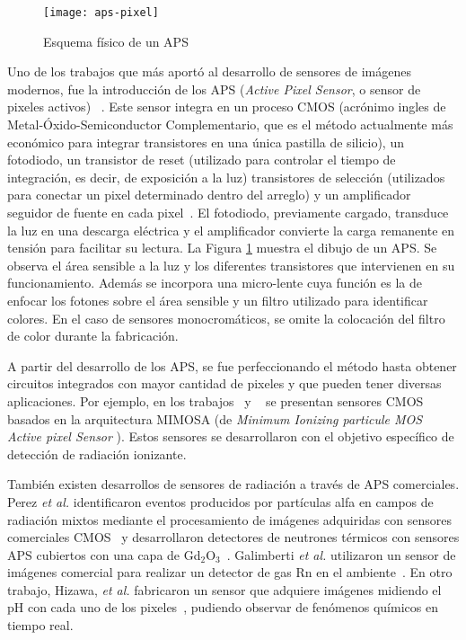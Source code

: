 \begin{figure}[t]
	\centering
	\texttt{[image: aps-pixel]}
	\caption{Esquema físico de un APS~\cite{Turchetta2019}}
	\label{fig:pix}
\end{figure}

Uno de los trabajos que más aportó al desarrollo de sensores de imágenes modernos, fue la introducción de los APS ({\it Active Pixel Sensor}, o sensor de pixeles activos) ~\cite{Mendis1994}. Este sensor integra en un proceso CMOS (acrónimo ingles de Metal-Óxido-Semiconductor Complementario, que es el método actualmente más económico para integrar transistores en una única pastilla de silicio), un fotodiodo, un transistor de reset (utilizado para controlar el tiempo de integración, es decir, de exposición a la luz) transistores de selección (utilizados para conectar un pixel determinado dentro del arreglo) y un amplificador seguidor de fuente en cada pixel~\cite{Turchetta2019}. El fotodiodo, previamente cargado, transduce la luz en una descarga eléctrica y el amplificador convierte la carga remanente en tensión para facilitar su lectura. La Figura \ref{fig:pix} muestra el dibujo de un APS. Se observa el área sensible a la luz y los diferentes transistores que intervienen en su funcionamiento. Además se incorpora una micro-lente cuya función es la de enfocar los fotones sobre el área sensible y un filtro utilizado para identificar colores. En el caso de sensores monocromáticos, se omite la colocación del filtro de color durante la fabricación.%

A partir del desarrollo de los APS, se fue perfeccionando el método hasta obtener circuitos integrados con mayor cantidad de pixeles y que pueden tener diversas aplicaciones. Por ejemplo, en los trabajos~\cite{Hu-Guo2009} y ~\cite{Baudot2009} se presentan sensores CMOS basados en la arquitectura MIMOSA (de {\it Minimum Ionizing particule MOS Active pixel Sensor}%
). Estos sensores se desarrollaron con el objetivo específico de detección de radiación ionizante.%

También existen desarrollos de sensores de radiación a través de APS comerciales. Perez {\it et al.} identificaron eventos producidos por partículas alfa en campos de radiación mixtos mediante el procesamiento de imágenes adquiridas con sensores comerciales CMOS~\cite{Perez2016} y desarrollaron detectores de neutrones térmicos con sensores APS cubiertos con una capa de Gd$_2$O$_3$~\cite{Perez2018Thermal}. Galimberti {\it et al.} utilizaron un sensor de imágenes comercial para realizar un detector de gas Rn en el ambiente~\cite{Galimberti2018}. En otro trabajo, Hizawa, {\it et al.} fabricaron un sensor que adquiere imágenes midiendo el pH con cada uno de los pixeles~\cite{Hizawa2007}, pudiendo observar de fenómenos químicos en tiempo real.%

